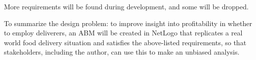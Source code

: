 More requirements will be found during development, and some will be dropped.

To summarize the design problem: to improve insight into profitability in whether to employ deliverers,
an ABM will be created in NetLogo that replicates a real world food delivery situation and satisfies the above-listed requirements,
so that stakeholders, including the author, can use this to make an unbiased analysis.
